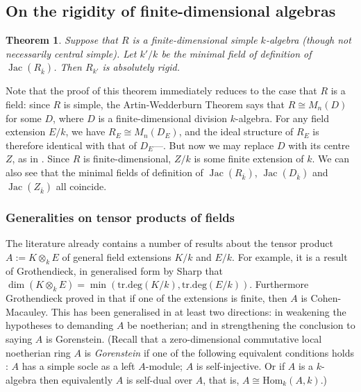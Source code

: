 \documentclass[11pt,reqno]{amsart}
\newtheorem{theorem}[lemma]{Theorem}
\theoremstyle{definition}
\theoremstyle{remark}
\theoremstyle{definition}
\theoremstyle{plain}
\DeclareMathOperator{\Jac}{Jac}
\newcommand{\Hom}{\mathrm{Hom}}
\newcommand{\bark}{{\overline{k}}}
\begin{document}
\subsection{On the rigidity of finite-dimensional algebras}\label{sec:rigidity}

\begin{theorem}\label{thm:Drigid}
Suppose that $R$ is a finite-dimensional simple $k$-algebra (though not necessarily central simple).
Let $k'/k$ be the minimal field of definition of $\Jac(R_{\bark})$. Then $R_{k'}$ is absolutely rigid. 
\end{theorem}

Note that the proof of this theorem immediately reduces to the case that $R$ is a field:
since $R$ is simple, the Artin-Wedderburn Theorem says that $R\cong M_n(D)$ for some $D$, where $D$ is a finite-dimensional division $k$-algebra.
For any field extension $E/k$, we have $R_E \cong M_n(D_E)$, and the ideal structure of $R_E$ is therefore identical with that of $D_E$---\cite[3.1]{Lam1}.
But now we may replace $D$ with its centre $Z$, as in .
Since $R$ is finite-dimensional, $Z/k$ is some finite extension of $k$.
We can also see that the minimal fields of definition of $\Jac(R_\bark)$, $\Jac(D_\bark)$ and $\Jac(Z_\bark)$ all coincide.
 



\subsubsection{Generalities on tensor products of fields}\label{sec:tensor}
The literature already contains a number of results about the tensor product $A:=K\otimes_k E$ of general field extensions $K/k$ and $E/k$. 
For example, it is a result of Grothendieck, in generalised form by Sharp \cite{Sha77} that $\dim(K\otimes_k E)=\min(\mathrm{tr.deg}(K/k),\mathrm{tr.deg}(E/k))$. 
Furthermore Grothendieck proved in \cite[Lem.~6.7.1.1]{EGAIV65} that if one of the extensions is finite, then $A$ is Cohen-Macauley. This has been generalised in at least two directions: in \cite[Lem.~2.2]{BK02} weakening the hypotheses to demanding $A$ be noetherian; and in \cite[I.Thm.~2]{watanabe} strengthening the conclusion to saying $A$ is  Gorenstein. (Recall that a zero-dimensional commutative local noetherian ring $A$ is \emph{Gorenstein} if one of the following equivalent conditions holds \cite[Prop. 21.5]{Eisenbud}: $A$ has a simple socle as a left $A$-module; $A$ is self-injective. Or if $A$ is a $k$-algebra then equivalently $A$ is self-dual over $A$, that is, $A\cong \Hom_k(A,k)$.)
\end{document}
